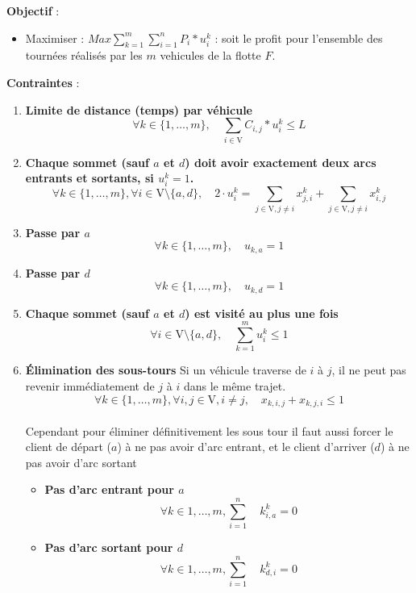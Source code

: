 \documentclass[a4paper, 12pt, DIV=12]{scrartcl}
\begin{document}
\textbf{Objectif} :
\begin{itemize}
    \item Maximiser : $Max\sum_{k=1}^{m} \sum_{i=1}^{n} P_i *u^k_i$ : soit le profit pour l'ensemble des tournées réalisés par les $m$ vehicules de la flotte $F$.
\end{itemize}
\newpage
\textbf{Contraintes} :
\begin{enumerate}
        \item \textbf{Limite de distance (temps) par véhicule}  
        \[
        \forall k \in \{1, \ldots, m\}, \quad \sum_{i \in \text{V}}  C_{i, j} * u_{i}^k \leq L
        \]

        \item \textbf{Chaque sommet (sauf $a$ et $d$) doit avoir exactement deux arcs entrants et sortants, si $u_{i}^k = 1$. }  
        \[
        \forall k \in \{1, \ldots, m\}, \forall i \in \text{V} \setminus \{a, d\}, \quad 
        2 \cdot u_{i}^k = \sum_{j \in \text{V}, j \neq i} x_{j, i}^k+ \sum_{j \in \text{V}, j \neq i} x_{i, j}^k
        \]

        \item \textbf{Passe par $a$}  
        \[
        \forall k \in \{1, \ldots, m\}, \quad u_{k, a} = 1
        \]

        \item \textbf{Passe par $d$}  
        \[
        \forall k \in \{1, \ldots, m\}, \quad u_{k, d} = 1
        \]

        \item \textbf{Chaque sommet (sauf $a$ et $d$) est visité au plus une fois}  
        \[
        \forall i \in \text{V} \setminus \{a, d\}, \quad \sum_{k =1}^m u_{i}^k \leq 1
        \]

        \item \textbf{Élimination des sous-tours}  
        Si un véhicule traverse de $i$ à $j$, il ne peut pas revenir immédiatement de $j$ à $i$ dans le même trajet.  
        \[
        \forall k \in \{1, \ldots, m\}, \forall i, j \in \text{V}, i \neq j, \quad 
        x_{k, i, j} + x_{k, j, i} \leq 1
        \]\\[10pt]
        Cependant pour éliminer définitivement les sous tour il faut aussi forcer le client de départ ($a$) à ne pas avoir d'arc entrant, et le client d'arriver ($d$) à ne pas avoir d'arc sortant

        \begin{itemize}
            \item \textbf{Pas d'arc entrant pour $a$}
            \[
            \forall k \in {1, \ldots, m}, \sum_{i=1}^n \quad k_{i, a}^k = 0
            \]
            \item \textbf{Pas d'arc sortant pour $d$}
            \[
            \forall k \in {1, \ldots, m}, \sum_{i=1}^n \quad k_{d, i}^k = 0
            \]
        \end{itemize}
    \end{enumerate}
\end{document}

